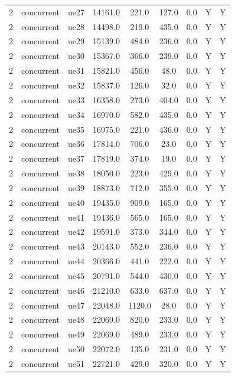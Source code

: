 \begin{table}[ht]
\begin{tabular}{|c|c|c|c|c|c|c|c|c|}
2 & concurrent & ue27 & 14161.0 & 221.0 & 127.0 & 0.0 & Y & Y \\
2 & concurrent & ue28 & 14498.0 & 219.0 & 435.0 & 0.0 & Y & Y \\
2 & concurrent & ue29 & 15139.0 & 484.0 & 236.0 & 0.0 & Y & Y \\
2 & concurrent & ue30 & 15367.0 & 366.0 & 239.0 & 0.0 & Y & Y \\
2 & concurrent & ue31 & 15821.0 & 456.0 & 48.0 & 0.0 & Y & Y \\
2 & concurrent & ue32 & 15837.0 & 126.0 & 32.0 & 0.0 & Y & Y \\
2 & concurrent & ue33 & 16358.0 & 273.0 & 404.0 & 0.0 & Y & Y \\
2 & concurrent & ue34 & 16970.0 & 582.0 & 435.0 & 0.0 & Y & Y \\
2 & concurrent & ue35 & 16975.0 & 221.0 & 436.0 & 0.0 & Y & Y \\
2 & concurrent & ue36 & 17814.0 & 706.0 & 23.0 & 0.0 & Y & Y \\
2 & concurrent & ue37 & 17819.0 & 374.0 & 19.0 & 0.0 & Y & Y \\
2 & concurrent & ue38 & 18050.0 & 223.0 & 429.0 & 0.0 & Y & Y \\
2 & concurrent & ue39 & 18873.0 & 712.0 & 355.0 & 0.0 & Y & Y \\
2 & concurrent & ue40 & 19435.0 & 909.0 & 165.0 & 0.0 & Y & Y \\
2 & concurrent & ue41 & 19436.0 & 565.0 & 165.0 & 0.0 & Y & Y \\
2 & concurrent & ue42 & 19591.0 & 373.0 & 344.0 & 0.0 & Y & Y \\
2 & concurrent & ue43 & 20143.0 & 552.0 & 236.0 & 0.0 & Y & Y \\
2 & concurrent & ue44 & 20366.0 & 441.0 & 222.0 & 0.0 & Y & Y \\
2 & concurrent & ue45 & 20791.0 & 544.0 & 430.0 & 0.0 & Y & Y \\
2 & concurrent & ue46 & 21210.0 & 633.0 & 637.0 & 0.0 & Y & Y \\
2 & concurrent & ue47 & 22048.0 & 1120.0 & 28.0 & 0.0 & Y & Y \\
2 & concurrent & ue48 & 22069.0 & 820.0 & 233.0 & 0.0 & Y & Y \\
2 & concurrent & ue49 & 22069.0 & 489.0 & 233.0 & 0.0 & Y & Y \\
2 & concurrent & ue50 & 22072.0 & 135.0 & 231.0 & 0.0 & Y & Y \\
2 & concurrent & ue51 & 22721.0 & 429.0 & 320.0 & 0.0 & Y & Y \\

\end{tabular}
\end{table}
